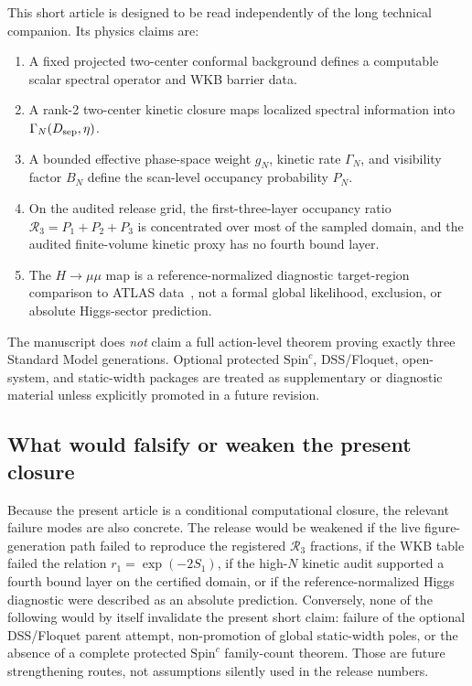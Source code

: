 \documentclass[pdflatex,sn-mathphys-num,iicol]{sn-jnl}
\newcommand{\Rthree}{\mathcal{R}_3}
\newcommand{\Dsep}{D_{\rm sep}}
\begin{document}
This short article is designed to be read independently of the long technical companion.
Its physics claims are:
\begin{enumerate}
    \item A fixed projected two-center conformal background defines a computable scalar spectral operator and WKB barrier data.
    \item A rank-2 two-center kinetic closure maps localized spectral information into \(\Gamma_N(\Dsep,\eta)\).
    \item A bounded effective phase-space weight \(g_N\), kinetic rate \(\Gamma_N\), and visibility factor \(B_N\) define the scan-level occupancy probability \(P_N\).
    \item On the audited release grid, the first-three-layer occupancy ratio \(\Rthree=P_1+P_2+P_3\) is concentrated over most of the sampled domain, and the audited finite-volume kinetic proxy has no fourth bound layer.
    \item The \(H\to\mu\mu\) map is a reference-normalized diagnostic target-region comparison to ATLAS data~\cite{ATLAS_Hmumu}, not a formal global likelihood, exclusion, or absolute Higgs-sector prediction.
\end{enumerate}

The manuscript does \emph{not} claim a full action-level theorem proving exactly three Standard Model generations.
Optional protected \(\mathrm{Spin}^c\), DSS/Floquet, open-system, and static-width packages are treated as supplementary or diagnostic material unless explicitly promoted in a future revision.

\subsection{What would falsify or weaken the present closure}

Because the present article is a conditional computational closure, the relevant failure modes are also concrete.
The release would be weakened if the live figure-generation path failed to reproduce the registered \(\Rthree\) fractions, if the WKB table failed the relation \(r_1=\exp(-2S_1)\), if the high-\(N\) kinetic audit supported a fourth bound layer on the certified domain, or if the reference-normalized Higgs diagnostic were described as an absolute prediction.
Conversely, none of the following would by itself invalidate the present short claim: failure of the optional DSS/Floquet parent attempt, non-promotion of global static-width poles, or the absence of a complete protected \(\mathrm{Spin}^c\) family-count theorem.
Those are future strengthening routes, not assumptions silently used in the release numbers.
\end{document}
